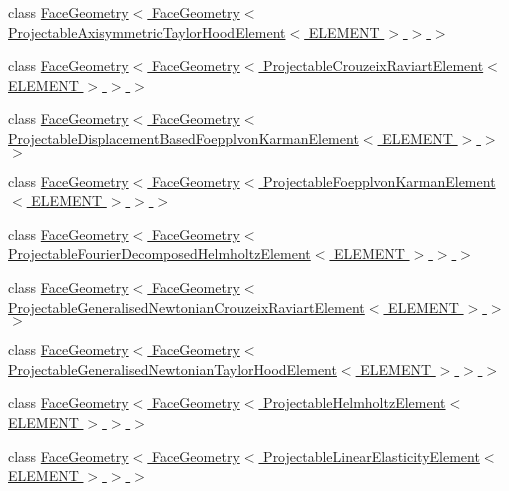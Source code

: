 \begin{DoxyCompactItemize}
\item 
class \hyperlink{classoomph_1_1FaceGeometry_3_01FaceGeometry_3_01ProjectableAxisymmetricTaylorHoodElement_3_01ELEMENT_01_4_01_4_01_4}{Face\+Geometry$<$ Face\+Geometry$<$ Projectable\+Axisymmetric\+Taylor\+Hood\+Element$<$ E\+L\+E\+M\+E\+N\+T $>$ $>$ $>$}
\item 
class \hyperlink{classoomph_1_1FaceGeometry_3_01FaceGeometry_3_01ProjectableCrouzeixRaviartElement_3_01ELEMENT_01_4_01_4_01_4}{Face\+Geometry$<$ Face\+Geometry$<$ Projectable\+Crouzeix\+Raviart\+Element$<$ E\+L\+E\+M\+E\+N\+T $>$ $>$ $>$}
\item 
class \hyperlink{classoomph_1_1FaceGeometry_3_01FaceGeometry_3_01ProjectableDisplacementBasedFoepplvonKarmanElement_3_01ELEMENT_01_4_01_4_01_4}{Face\+Geometry$<$ Face\+Geometry$<$ Projectable\+Displacement\+Based\+Foepplvon\+Karman\+Element$<$ E\+L\+E\+M\+E\+N\+T $>$ $>$ $>$}
\item 
class \hyperlink{classoomph_1_1FaceGeometry_3_01FaceGeometry_3_01ProjectableFoepplvonKarmanElement_3_01ELEMENT_01_4_01_4_01_4}{Face\+Geometry$<$ Face\+Geometry$<$ Projectable\+Foepplvon\+Karman\+Element$<$ E\+L\+E\+M\+E\+N\+T $>$ $>$ $>$}
\item 
class \hyperlink{classoomph_1_1FaceGeometry_3_01FaceGeometry_3_01ProjectableFourierDecomposedHelmholtzElement_3_01ELEMENT_01_4_01_4_01_4}{Face\+Geometry$<$ Face\+Geometry$<$ Projectable\+Fourier\+Decomposed\+Helmholtz\+Element$<$ E\+L\+E\+M\+E\+N\+T $>$ $>$ $>$}
\item 
class \hyperlink{classoomph_1_1FaceGeometry_3_01FaceGeometry_3_01ProjectableGeneralisedNewtonianCrouzeixRaviartEl4220904a4c68e0a7e20ecca026fcda1b}{Face\+Geometry$<$ Face\+Geometry$<$ Projectable\+Generalised\+Newtonian\+Crouzeix\+Raviart\+Element$<$ E\+L\+E\+M\+E\+N\+T $>$ $>$ $>$}
\item 
class \hyperlink{classoomph_1_1FaceGeometry_3_01FaceGeometry_3_01ProjectableGeneralisedNewtonianTaylorHoodElement_3_01ELEMENT_01_4_01_4_01_4}{Face\+Geometry$<$ Face\+Geometry$<$ Projectable\+Generalised\+Newtonian\+Taylor\+Hood\+Element$<$ E\+L\+E\+M\+E\+N\+T $>$ $>$ $>$}
\item 
class \hyperlink{classoomph_1_1FaceGeometry_3_01FaceGeometry_3_01ProjectableHelmholtzElement_3_01ELEMENT_01_4_01_4_01_4}{Face\+Geometry$<$ Face\+Geometry$<$ Projectable\+Helmholtz\+Element$<$ E\+L\+E\+M\+E\+N\+T $>$ $>$ $>$}
\item 
class \hyperlink{classoomph_1_1FaceGeometry_3_01FaceGeometry_3_01ProjectableLinearElasticityElement_3_01ELEMENT_01_4_01_4_01_4}{Face\+Geometry$<$ Face\+Geometry$<$ Projectable\+Linear\+Elasticity\+Element$<$ E\+L\+E\+M\+E\+N\+T $>$ $>$ $>$}

\end{DoxyCompactItemize}
